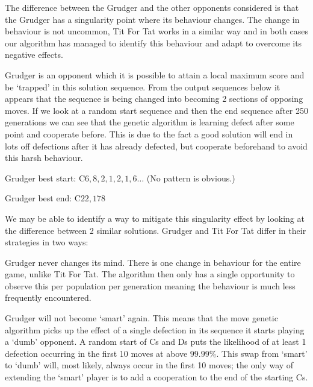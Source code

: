 The difference between the Grudger and the other opponents considered is that the Grudger has a singularity point where its behaviour changes.
The change in behaviour is not uncommon, Tit For Tat works in a similar way and in both cases our algorithm has managed to identify this behaviour and adapt to overcome its negative effects.

Grudger is an opponent which it is possible to attain a local maximum score and be `trapped' in this solution sequence.
From the output sequences below it appears that the sequence is being changed into becoming 2 sections of opposing moves.
If we look at a random start sequence and then the end sequence after 250 generations we can see that the genetic algorithm is learning defect after some point and cooperate before.
This is due to the fact a good solution will end in lots off defections after it has already defected, but cooperate beforehand to avoid this harsh behaviour.

Grudger best start: C$6,8,2,1,2,1,6\ldots$ (No pattern is obvious.)

Grudger best end: C$22,178$

We may be able to identify a way to mitigate this singularity effect by looking at the difference between 2 similar solutions.
Grudger and Tit For Tat differ in their strategies in two ways:

\begin{itemize}
    \begin{item}
        Grudger never changes its mind.
        There is one change in behaviour for the entire game, unlike Tit For Tat.
        The algorithm then only has a single opportunity to observe this per population per generation meaning the behaviour is much less frequently encountered.
    \end{item}
    \begin{item}
        Grudger will not become `smart' again.
        This means that the move genetic algorithm picks up the effect of a single defection in its sequence it starts playing a `dumb' opponent.
        A random start of Cs and Ds puts the likelihood of at least 1 defection occurring in the first 10 moves at above \(99.99\% \).
        This swap from `smart' to `dumb' will, most likely, always occur in the first 10 moves;
        the only way of extending the `smart' player is to add a cooperation to the end of the starting Cs.
    \end{item}
\end{itemize}


